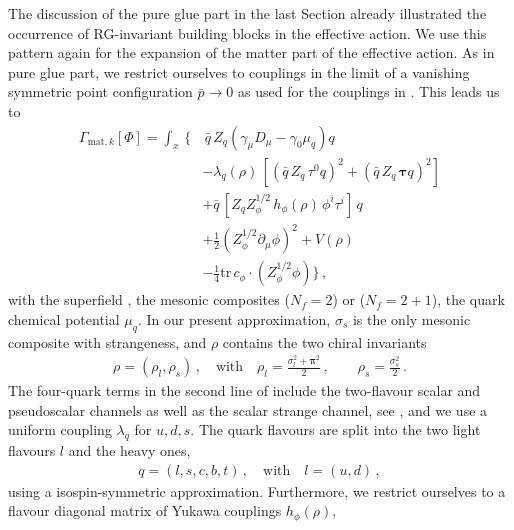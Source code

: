 \documentclass[aps,twocolumn,prd,superscriptaddress]{revtex4-2}
\begin{document}
The discussion of the pure glue part in the last Section already illustrated the occurrence of RG-invariant building blocks in the effective action. 
We use this pattern again for the expansion of the matter part of the effective action. As in pure glue part, we restrict ourselves to couplings in the limit of a vanishing symmetric point configuration $\bar p\to 0$ as used for the couplings in . This leads us to 
%
\begin{align}\nonumber
	\Gamma_{\textrm{mat},k}[\Phi] = \int_x \,\Biggl\{&  \,\bar q \, Z_q \left( \gamma_\mu D_\mu-\gamma_0 \mu_q \right)q \\[1ex]\nonumber
	                 & - \lambda_q(\rho) \, \left[ \left(\bar q  \,Z_q\,\tau^0 q\right)^2 + \left(\bar q \,Z_q\,\bm \tau q \right)^2 \right]          \\[1ex]\nonumber
	                 & + \bar q\, \left[  Z_q Z_\phi^{1/2} \,h_\phi(\rho)\,\phi^i \tau^i\right]\,q                                  \\[1ex]\nonumber 
	                 & +\frac{1}{2} \left( Z_\phi^{1/2} \partial_\mu \phi \right)^2 + V(\rho)\\[1ex]
	                 & -\frac14 \textrm{tr}\, c_\phi \cdot \left(Z_\phi^{1/2} \phi\right)	\Biggr\}\,,
	\label{eq:Gammamatter}
\end{align}
%
with the superfield , the mesonic composites  ($N_f=2$) or 	 ($N_f=2+1$), the quark chemical potential $\mu_q$. In our present approximation, $\sigma_s$ is the only mesonic composite with strangeness, and $\rho$ contains the two chiral invariants 
%
\begin{align}
\rho=\left(\rho_l,\rho_s\right) \,,\quad \textrm{with}\quad \rho_l = \frac{\sigma_{l}^2+\boldsymbol{\pi}^2}{2}\,,\qquad   \rho_s = \frac{\sigma_{s}^2}{2}\,.
\label{eq:rho-rhos}
\end{align}
%
The four-quark terms in the second line of  include the two-flavour scalar and pseudoscalar channels as well as the scalar strange channel, see , and we use a uniform coupling $\lambda_q$ for $u,d,s$. The quark flavours are split into the two light flavours $l$ and the heavy ones, 
%
\begin{align} 
	q= ( l,s,c,b,t)\,,\quad \textrm{with} \quad l=(u,d)\,, 
\end{align}
% 
using a isospin-symmetric approximation. Furthermore, we restrict ourselves to a flavour diagonal matrix of Yukawa couplings $h_\phi(\rho)$, 
\end{document}
